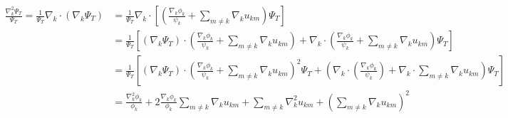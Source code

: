 \documentclass[aps,reprint,superscriptaddress,nofootinbib]{revtex4-2}
\begin{document}
    \begin{widetext}
        \begin{align*}
            \frac{\nabla_k^2 \Psi_T}{\Psi_T} = \frac{1}{\Psi_T} \nabla_k \cdot (\nabla_k \Psi_T) &= \frac{1}{\Psi_T} \nabla_k \cdot \left[ \left( \frac{\nabla_k \phi_k}{\psi_k} + \sum_{m \neq k} \nabla_k u_{km}\right) \Psi_T \right] \\
            &= \frac{1}{\Psi_T} \left[ (\nabla_k \Psi_T) \cdot \left( \frac{\nabla_k \phi_k}{\psi_k} +\sum_{m \neq k} \nabla_k u_{km} \right) + \nabla_k \cdot \left( \frac{\nabla_k \phi_k}{\psi_k} +\sum_{m \neq k} \nabla_k u_{km} \right) \Psi_T \right] \\
            &= \frac{1}{\Psi_T} \left[ (\nabla_k \Psi_T) \cdot \left( \frac{\nabla_k \phi_k}{\psi_k} +\sum_{m \neq k} \nabla_k u_{km} \right)^2 \Psi_T + \left( \nabla_k \cdot \left( \frac{\nabla_k \phi_k}{\psi_k} \right) + \nabla_k \cdot \sum_{m \neq k} \nabla_k u_{km} \right) \Psi_T \right] \\
            &= \frac{\nabla_k^2 \phi_k}{\phi_k} + 2 \frac{\nabla_k \phi_k}{\phi_k} \sum_{m \neq k} \nabla_k u_{km} + \sum_{m \neq k} \nabla_k^2 u_{km} + \left( \sum_{m \neq k} \nabla_k u_{km} \right)^2
        \end{align*}
    \end{widetext}
    
    \pagebreak
    \newpage
    
\end{document}
